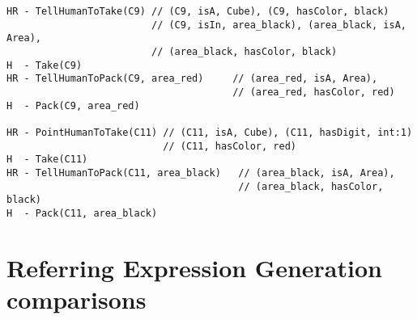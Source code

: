 \begin{lstlisting}
HR - TellHumanToTake(C9) // (C9, isA, Cube), (C9, hasColor, black)
                         // (C9, isIn, area_black), (area_black, isA, Area),
                         // (area_black, hasColor, black)
H  - Take(C9)
HR - TellHumanToPack(C9, area_red)     // (area_red, isA, Area),
                                       // (area_red, hasColor, red)
H  - Pack(C9, area_red)

HR - PointHumanToTake(C11) // (C11, isA, Cube), (C11, hasDigit, int:1)
                           // (C11, hasColor, red)
H  - Take(C11)
HR - TellHumanToPack(C11, area_black)   // (area_black, isA, Area),
                                        // (area_black, hasColor, black)
H  - Pack(C11, area_black)
\end{lstlisting}

\section{Referring Expression Generation comparisons}
\label{app:reg_comp_solutions}

